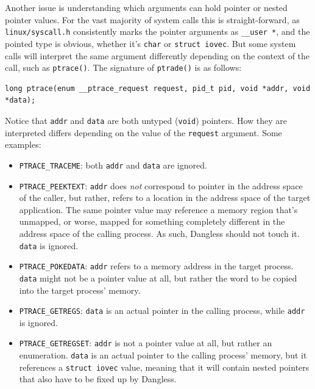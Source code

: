 Another issue is understanding which arguments can hold pointer or nested pointer values. For the vast majority of system calls this is straight-forward, as \texttt{linux/syscall.h} consistently marks the pointer arguments as \lstinline!__user *!, and the pointed type is obvious, whether it's \lstinline!char! or \lstinline!struct iovec!. But some system calls will interpret the same argument differently depending on the context of the call, such as \lstinline!ptrace()!. The signature of \lstinline!ptrade()! is as follows:

\begin{lstlisting}
long ptrace(enum __ptrace_request request, pid_t pid, void *addr, void *data);
\end{lstlisting}

Notice that \lstinline!addr! and \lstinline!data! are both untyped (\lstinline!void!) pointers. How they are interpreted differs depending on the value of the \lstinline!request! argument. Some examples:

\begin{itemize}
	\item \lstinline!PTRACE_TRACEME!: both \lstinline!addr! and \lstinline!data! are ignored.
	\item \lstinline!PTRACE_PEEKTEXT!: \lstinline!addr! does \emph{not} correspond to pointer in the address space of the caller, but rather, refers to a location in the address space of the target application. The same pointer value may reference a memory region that's unmapped, or worse, mapped for something completely different in the address space of the calling process. As such, Dangless should not touch it. \lstinline!data! is ignored.
	\item \lstinline!PTRACE_POKEDATA!: \lstinline!addr! refers to a memory address in the target process. \lstinline!data! might not be a pointer value at all, but rather the word to be copied into the target process' memory.
	\item \lstinline!PTRACE_GETREGS!: \lstinline!data! is an actual pointer in the calling process, while \lstinline!addr! is ignored.
	\item \lstinline!PTRACE_GETREGSET!: \lstinline!addr! is not a pointer value at all, but rather an enumeration. \lstinline!data! is an actual pointer to the calling process' memory, but it references a \lstinline!struct iovec! value, meaning that it will contain nested pointers that also have to be fixed up by Dangless.
\end{itemize}

